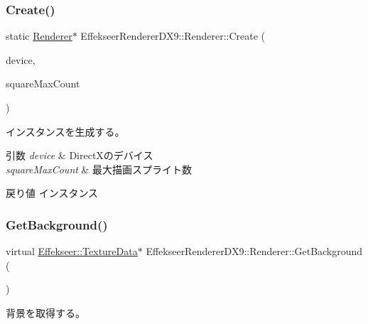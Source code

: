 \subsubsection{\texorpdfstring{Create()}{Create()}}
{\footnotesize\ttfamily static \mbox{\hyperlink{class_effekseer_renderer_d_x9_1_1_renderer}{Renderer}}$\ast$ Effekseer\+Renderer\+D\+X9\+::\+Renderer\+::\+Create (\begin{DoxyParamCaption}\item[{L\+P\+D\+I\+R\+E\+C\+T3\+D\+D\+E\+V\+I\+C\+E9}]{device,  }\item[{int32\+\_\+t}]{square\+Max\+Count }\end{DoxyParamCaption})\hspace{0.3cm}{\ttfamily [static]}}



インスタンスを生成する。 


\begin{DoxyParams}{引数}
{\em device} & Direct\+Xのデバイス \\
\hline
{\em square\+Max\+Count} & 最大描画スプライト数 \\
\hline
\end{DoxyParams}
\begin{DoxyReturn}{戻り値}
インスタンス 
\end{DoxyReturn}
\mbox{\label{class_effekseer_renderer_d_x9_1_1_renderer_a98f5bc52650df1982e9fb75b3c735d65}} 
\subsubsection{\texorpdfstring{Get\+Background()}{GetBackground()}}
{\footnotesize\ttfamily virtual \mbox{\hyperlink{struct_effekseer_1_1_texture_data}{Effekseer\+::\+Texture\+Data}}$\ast$ Effekseer\+Renderer\+D\+X9\+::\+Renderer\+::\+Get\+Background (\begin{DoxyParamCaption}{ }\end{DoxyParamCaption})\hspace{0.3cm}{\ttfamily [pure virtual]}}



背景を取得する。 

\mbox{\label{class_effekseer_renderer_d_x9_1_1_renderer_a41c5637f9dcf5341d12b9b61ee46bd74}} 
